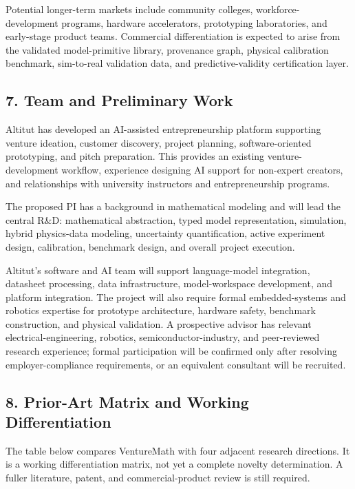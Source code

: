 \documentclass[12pt,letterpaper]{article}
\begin{document}
Potential longer-term markets include community colleges, workforce-development programs, hardware accelerators, prototyping laboratories, and early-stage product teams. Commercial differentiation is expected to arise from the validated model-primitive library, provenance graph, physical calibration benchmark, sim-to-real validation data, and predictive-validity certification layer.

\subsection*{7. Team and Preliminary Work}

Altitut has developed an AI-assisted entrepreneurship platform supporting venture ideation, customer discovery, project planning, software-oriented prototyping, and pitch preparation. This provides an existing venture-development workflow, experience designing AI support for non-expert creators, and relationships with university instructors and entrepreneurship programs.

The proposed PI has a background in mathematical modeling and will lead the central R\&D: mathematical abstraction, typed model representation, simulation, hybrid physics-data modeling, uncertainty quantification, active experiment design, calibration, benchmark design, and overall project execution.

Altitut's software and AI team will support language-model integration, datasheet processing, data infrastructure, model-workspace development, and platform integration. The project will also require formal embedded-systems and robotics expertise for prototype architecture, hardware safety, benchmark construction, and physical validation. A prospective advisor has relevant electrical-engineering, robotics, semiconductor-industry, and peer-reviewed research experience; formal participation will be confirmed only after resolving employer-compliance requirements, or an equivalent consultant will be recruited.

\subsection*{8. Prior-Art Matrix and Working Differentiation}

The table below compares VentureMath with four adjacent research directions. It is a working differentiation matrix, not yet a complete novelty determination. A fuller literature, patent, and commercial-product review is still required.
\end{document}
